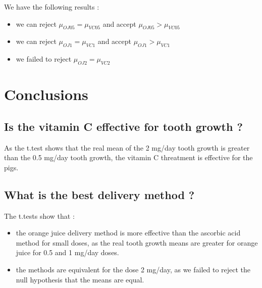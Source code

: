 \documentclass[a4paper, 11pt]{article}\usepackage[]{graphicx}\usepackage[]{color}
\begin{document}
\noindent
We have the following results :
\begin{itemize}
    \item we can reject  $\mu_{OJ05} = \mu_{VC05}$ and accept  $\mu_{OJ05} > \mu_{VC05}$
    \item we can reject  $\mu_{OJ1} = \mu_{VC1}$ and accept  $\mu_{OJ1} > \mu_{VC1}$
    \item we failed to reject  $\mu_{OJ2} = \mu_{VC2}$
\end{itemize}

\section{Conclusions}
\subsection{Is the vitamin C effective for tooth growth ?}
As the t.test shows that the real mean of the 2 mg/day tooth growth is greater than the 0.5 mg/day tooth growth, the vitamin C threatment is effective for the pigs.
\subsection{What is the best delivery method ?}
The t.tests show that :
\begin{itemize}
    \item the orange juice delivery method is more effective than the ascorbic acid method for small doses, as the real tooth growth means are greater for orange juice for 0.5 and 1 mg/day doses.
    \item the methods are equivalent for the dose 2 mg/day, as we failed to reject the null hypothesis that the means are equal.
\end{itemize}
\end{document}
